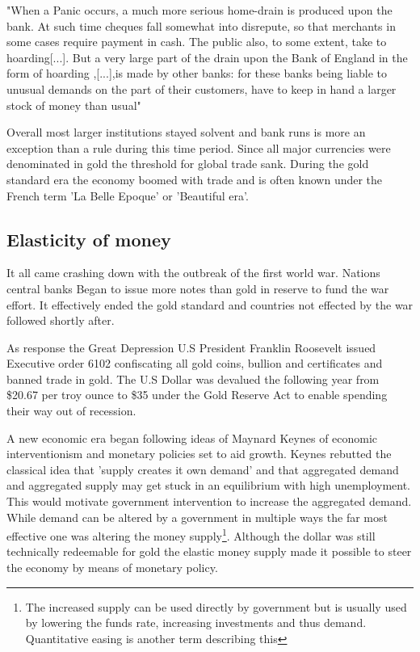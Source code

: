 \begin{displayquote}
	"When a Panic occurs, a much more serious home-drain is produced upon the bank. At such time cheques fall somewhat into disrepute, so that merchants in some cases require payment in cash. The public also, to some extent, take to hoarding[...]. But a very large part of the drain upon the Bank of England in the form of hoarding ,[...],is made by other banks: for these banks being liable to unusual demands on the part of their customers, have to keep in hand a larger stock of money than usual"\cite{patterson:monetary:drains}
\end{displayquote}

Overall most larger institutions stayed solvent and bank runs is more an exception than a rule during this time period. Since all major currencies were denominated in gold the threshold for global trade sank. During the gold standard era the economy boomed with trade and is often known under the French term 'La Belle Epoque' or 'Beautiful era'. 

\onecolumn

\subsection{Elasticity of money}

It all came crashing down with the outbreak of the first world war. Nations central banks Began to issue more notes than gold in reserve to fund the war effort. It effectively ended the gold standard and countries not effected by the war followed shortly after.

As response the Great Depression U.S President Franklin Roosevelt issued Executive order 6102 confiscating all gold coins, bullion and certificates and banned trade in gold\cite{roosevelt:6102}. The U.S Dollar was devalued the following year from \$20.67 per troy ounce to \$35 under the Gold Reserve Act\cite{gold:reserve:act} to enable spending their way out of recession. 

A new economic era began following ideas of Maynard Keynes of economic interventionism and monetary policies set to aid growth. Keynes rebutted the classical idea that 'supply creates it own demand' and that aggregated demand and aggregated supply may get stuck in an equilibrium with high unemployment\cite{keynes:general:theory}. This would motivate government intervention to increase the aggregated demand. While demand can be altered by a government in multiple ways the far most effective one was altering the money supply\footnote{The increased supply can be used directly by government but is usually used by lowering the funds rate, increasing investments and thus demand. Quantitative easing is another term describing this }. Although the dollar was still technically redeemable for gold the elastic money supply made it possible to steer the economy by means of monetary policy. 

